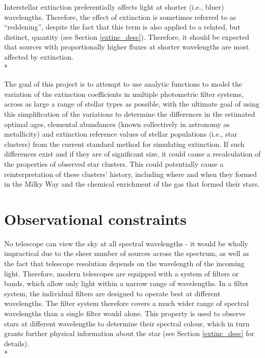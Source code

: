 \documentclass[12pt, a4paper]{report}
\begin{document}
Interstellar extinction preferentially affects light at shorter (i.e., bluer) wavelengths. Therefore, the effect of extinction is sometimes referred to as ``reddening'', despite the fact that this term is also applied to a related, but distinct, quantity (see Section \ref{extinc_desc}). Therefore, it should be expected that sources with proportionally higher fluxes at shorter wavelengths are most affected by extinction. \\*

The goal of this project is to attempt to use analytic functions to model the variation of the extinction coefficients in multiple photometric filter systems, across as large a range of stellar types as possible, with the ultimate goal of using this simplification of the variations to determine the differences in the estimated optimal ages, elemental abundances (known collectively in astronomy as metallicity) and extinction reference values of stellar populations (i.e., star clusters) from the current standard method for simulating extinction. If such differences exist and if they are of significant size, it could cause a recalculation of the properties of observed star clusters. This could potentially cause a reinterpretation of these clusters' history, including where and when they formed in the Milky Way and the chemical enrichment of the gas that formed their stars.

\section{Observational constraints}
No telescope can view the sky at all spectral wavelengths - it would be wholly impractical due to the sheer number of sources across the spectrum, as well as the fact that telescope resolution depends on the wavelength of the incoming light. Therefore, modern telescopes are equipped with a system of filters or bands, which allow only light within a narrow range of wavelengths. In a filter system, the individual filters are designed to operate best at different wavelengths. The filter system therefore covers a much wider range of spectral wavelengths than a single filter would alone. This property is used to observe stars at different wavelengths to determine their spectral colour, which in turn grants further physical information about the star (see Section \ref{extinc_desc} for details). \\*
\end{document}
